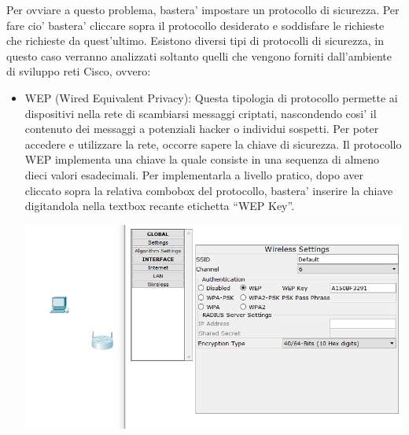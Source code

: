 Per ovviare a questo problema, bastera’ impostare un protocollo di sicurezza. Per fare cio’ bastera’ cliccare sopra il protocollo desiderato e soddisfare le richieste che richieste da quest’ultimo. Esistono diversi tipi di protocolli di sicurezza, in questo caso verranno analizzati soltanto quelli che vengono forniti dall’ambiente di sviluppo reti Cisco, ovvero:

\begin{itemize}
    \item WEP (Wired Equivalent Privacy): Questa tipologia di protocollo permette ai dispositivi nella rete di scambiarsi messaggi criptati, nascondendo cosi’ il contenuto dei messaggi a potenziali hacker o individui sospetti. Per poter accedere e utilizzare la rete, occorre sapere la chiave di sicurezza. Il protocollo WEP implementa una chiave la quale consiste in una sequenza di almeno dieci valori esadecimali. Per implementarla a livello pratico, dopo aver cliccato sopra la relativa combobox del protocollo, bastera’ inserire la chiave digitandola nella textbox recante etichetta “WEP Key”.\par
    \begin{center}
        \includegraphics[width=\linewidth]{images/08.wireless/08.png}
    \end{center}


\end{itemize}
